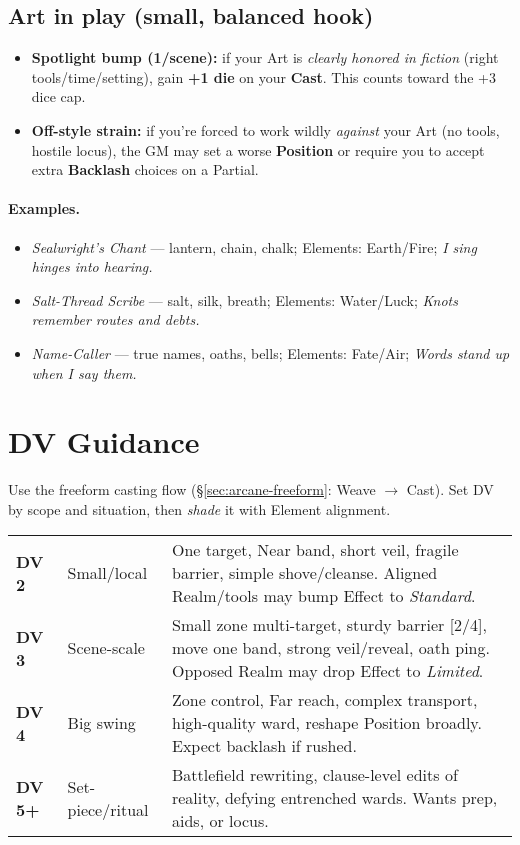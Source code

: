 \documentclass[11pt]{article}
\begin{document}
\subsection*{Art in play (small, balanced hook)}
\begin{itemize}
  \item \textbf{Spotlight bump (1/scene):} if your Art is \emph{clearly honored in fiction} (right tools/time/setting), gain \textbf{+1 die} on your \textbf{Cast}. This counts toward the +3 dice cap.
  \item \textbf{Off-style strain:} if you're forced to work wildly \emph{against} your Art (no tools, hostile locus), the GM may set a worse \textbf{Position} or require you to accept extra \textbf{Backlash} choices on a Partial.
\end{itemize}

\paragraph{Examples.}
\begin{itemize}
  \item \emph{Sealwright's Chant} — lantern, chain, chalk; Elements: Earth/Fire; \textit{I sing hinges into hearing.}
  \item \emph{Salt-Thread Scribe} — salt, silk, breath; Elements: Water/Luck; \textit{Knots remember routes and debts.}
  \item \emph{Name-Caller} — true names, oaths, bells; Elements: Fate/Air; \textit{Words stand up when I say them.}
\end{itemize}

\bigskip


\section{DV Guidance}
\label{sec:dv-guidance-elements}

\noindent Use the freeform casting flow (\S\ref{sec:arcane-freeform}: Weave $\rightarrow$ Cast). Set DV by scope and situation, then \emph{shade} it with Element alignment.

\begin{tabular}{@{}llp{9cm}@{}}
\textbf{DV 2} & Small/local & One target, Near band, short veil, fragile barrier, simple shove/cleanse. Aligned Realm/tools may bump Effect to \emph{Standard}. \\
\textbf{DV 3} & Scene-scale & Small zone multi-target, sturdy barrier [2/4], move one band, strong veil/reveal, oath ping. Opposed Realm may drop Effect to \emph{Limited}. \\
\textbf{DV 4} & Big swing & Zone control, Far reach, complex transport, high-quality ward, reshape Position broadly. Expect backlash if rushed. \\
\textbf{DV 5+} & Set-piece/ritual & Battlefield rewriting, clause-level edits of reality, defying entrenched wards. Wants prep, aids, or locus. \\
\end{tabular}
\end{document}
